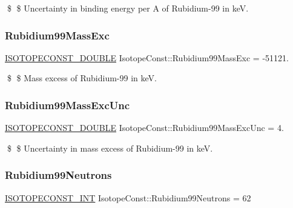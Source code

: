 \$ \$ Uncertainty in binding energy per A of Rubidium-\/99 in keV. \mbox{\label{group___isotope_const-_rubidium-_rb99_gacbe7a8d1c131d7044ea2e79806e3ca59}} 
\subsubsection{\texorpdfstring{Rubidium99\+Mass\+Exc}{Rubidium99MassExc}}
{\footnotesize\ttfamily \mbox{\hyperlink{group___isotope_const-_macros_ga8f45a7272ce02c0b4c65c44636ed719a}{I\+S\+O\+T\+O\+P\+E\+C\+O\+N\+S\+T\+\_\+\+D\+O\+U\+B\+LE}} Isotope\+Const\+::\+Rubidium99\+Mass\+Exc = -\/51121.}

\$ \$ Mass excess of Rubidium-\/99 in keV. \mbox{\label{group___isotope_const-_rubidium-_rb99_gaf1fee1f32d31969d97abeda7460a4ee9}} 
\subsubsection{\texorpdfstring{Rubidium99\+Mass\+Exc\+Unc}{Rubidium99MassExcUnc}}
{\footnotesize\ttfamily \mbox{\hyperlink{group___isotope_const-_macros_ga8f45a7272ce02c0b4c65c44636ed719a}{I\+S\+O\+T\+O\+P\+E\+C\+O\+N\+S\+T\+\_\+\+D\+O\+U\+B\+LE}} Isotope\+Const\+::\+Rubidium99\+Mass\+Exc\+Unc = 4.}

\$ \$ Uncertainty in mass excess of Rubidium-\/99 in keV. \mbox{\label{group___isotope_const-_rubidium-_rb99_ga7b07e75bfa51cf1aff02878f114584e3}} 
\subsubsection{\texorpdfstring{Rubidium99\+Neutrons}{Rubidium99Neutrons}}
{\footnotesize\ttfamily \mbox{\hyperlink{group___isotope_const-_macros_ga5f18360b3e99483a35c32d789e62621c}{I\+S\+O\+T\+O\+P\+E\+C\+O\+N\+S\+T\+\_\+\+I\+NT}} Isotope\+Const\+::\+Rubidium99\+Neutrons = 62}

